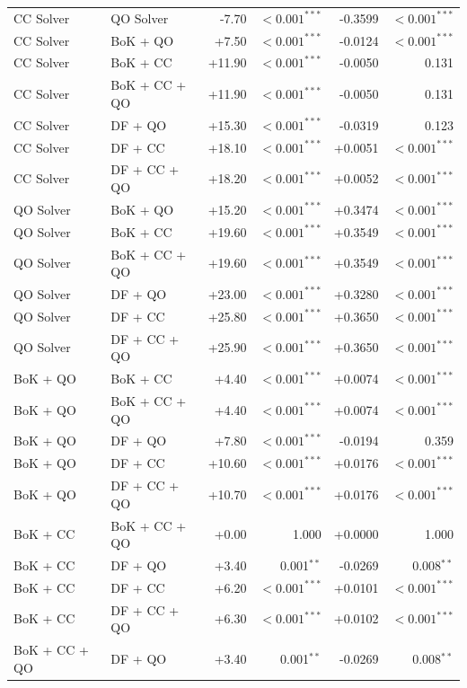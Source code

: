 \begin{table}[!tbh]
{\begin{tabular}{llrrrr}
CC Solver & QO Solver & -7.70 & $<\!0.001^{***}$ & -0.3599 & $<\!0.001^{***}$ \\
CC Solver & BoK + QO & +7.50 & $<\!0.001^{***}$ & -0.0124 & $<\!0.001^{***}$ \\
CC Solver & BoK + CC & +11.90 & $<\!0.001^{***}$ & -0.0050 & 0.131 \\
CC Solver & BoK + CC + QO & +11.90 & $<\!0.001^{***}$ & -0.0050 & 0.131 \\
CC Solver & DF + QO & +15.30 & $<\!0.001^{***}$ & -0.0319 & 0.123 \\
CC Solver & DF + CC & +18.10 & $<\!0.001^{***}$ & +0.0051 & $<\!0.001^{***}$ \\
CC Solver & DF + CC + QO & +18.20 & $<\!0.001^{***}$ & +0.0052 & $<\!0.001^{***}$ \\
QO Solver & BoK + QO & +15.20 & $<\!0.001^{***}$ & +0.3474 & $<\!0.001^{***}$ \\
QO Solver & BoK + CC & +19.60 & $<\!0.001^{***}$ & +0.3549 & $<\!0.001^{***}$ \\
QO Solver & BoK + CC + QO & +19.60 & $<\!0.001^{***}$ & +0.3549 & $<\!0.001^{***}$ \\
QO Solver & DF + QO & +23.00 & $<\!0.001^{***}$ & +0.3280 & $<\!0.001^{***}$ \\
QO Solver & DF + CC & +25.80 & $<\!0.001^{***}$ & +0.3650 & $<\!0.001^{***}$ \\
QO Solver & DF + CC + QO & +25.90 & $<\!0.001^{***}$ & +0.3650 & $<\!0.001^{***}$ \\
BoK + QO & BoK + CC & +4.40 & $<\!0.001^{***}$ & +0.0074 & $<\!0.001^{***}$ \\
BoK + QO & BoK + CC + QO & +4.40 & $<\!0.001^{***}$ & +0.0074 & $<\!0.001^{***}$ \\
BoK + QO & DF + QO & +7.80 & $<\!0.001^{***}$ & -0.0194 & 0.359 \\
BoK + QO & DF + CC & +10.60 & $<\!0.001^{***}$ & +0.0176 & $<\!0.001^{***}$ \\
BoK + QO & DF + CC + QO & +10.70 & $<\!0.001^{***}$ & +0.0176 & $<\!0.001^{***}$ \\
BoK + CC & BoK + CC + QO & +0.00 & 1.000 & +0.0000 & 1.000 \\
BoK + CC & DF + QO & +3.40 & 0.001$^{**}$ & -0.0269 & 0.008$^{**}$ \\
BoK + CC & DF + CC & +6.20 & $<\!0.001^{***}$ & +0.0101 & $<\!0.001^{***}$ \\
BoK + CC & DF + CC + QO & +6.30 & $<\!0.001^{***}$ & +0.0102 & $<\!0.001^{***}$ \\
BoK + CC + QO & DF + QO & +3.40 & 0.001$^{**}$ & -0.0269 & 0.008$^{**}$ \\

\end{tabular}}
\end{table}
